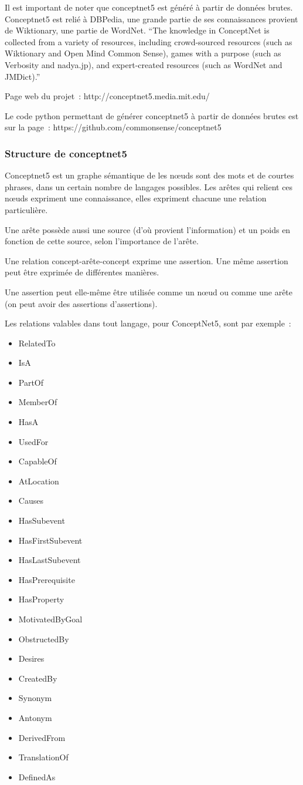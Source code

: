 \documentclass[a4paper,12pt]{article}
\begin{document}
Il est important de noter que conceptnet5 est généré à partir de données brutes. Conceptnet5 est relié à DBPedia, une grande partie de ses connaissances provient de Wiktionary, une partie de WordNet.
``The knowledge in ConceptNet is collected from a variety of resources, including crowd-sourced resources (such as Wiktionary and Open Mind Common Sense), games with a purpose (such as Verbosity and nadya.jp), and expert-created resources (such as WordNet and JMDict).''

Page web du projet~:
http://conceptnet5.media.mit.edu/

Le code python permettant de générer conceptnet5 à partir de données brutes est sur la page~:
https://github.com/commonsense/conceptnet5

\subsubsection{Structure de conceptnet5}

Conceptnet5 est un graphe sémantique de 
les n\oe{}uds sont des mots et de courtes phrases, dans un certain nombre de langages possibles. Les arêtes qui relient ces n\oe{}uds expriment une connaissance, elles expriment chacune une relation particulière.

Une arête possède aussi une source (d'où provient l'information) et un poids en fonction de cette source, selon l'importance de l'arête.

Une relation concept-arête-concept exprime une assertion. Une même assertion peut être exprimée de différentes manières.

Une assertion peut elle-même être utilisée comme un n\oe{}ud ou comme une arête (on peut avoir des assertions d'assertions).

Les relations valables dans tout langage, pour ConceptNet5, sont par exemple~: 
\begin{itemize}
 \item RelatedTo
 \item IsA
 \item PartOf
 \item MemberOf
 \item HasA
 \item UsedFor
 \item CapableOf
 \item AtLocation
 \item Causes
 \item HasSubevent
 \item HasFirstSubevent
 \item HasLastSubevent
 \item HasPrerequisite
 \item HasProperty
 \item MotivatedByGoal
 \item ObstructedBy
 \item Desires
 \item CreatedBy
 \item Synonym
 \item Antonym
 \item DerivedFrom
 \item TranslationOf
 \item DefinedAs
\end{itemize}
\end{document}
